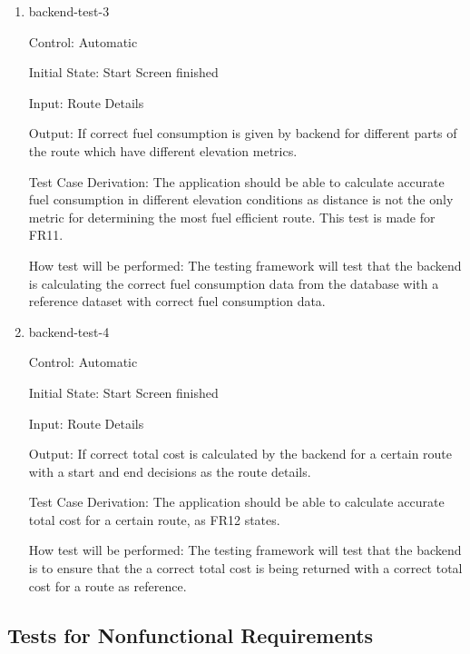 \documentclass[12pt, titlepage]{article}
\begin{document}
\begin{enumerate}
\item{backend-test-3\\}

Control: Automatic
					
Initial State: Start Screen finished
					
Input: Route Details
					
Output: If correct fuel consumption is given by backend for different parts of the route which have different elevation metrics.

Test Case Derivation: The application should be able to calculate accurate fuel consumption in different elevation conditions as 
distance is not the only metric for determining the most fuel efficient route. This test is made for FR11.
					
How test will be performed: The testing framework will test that the backend is calculating the correct fuel consumption data from the database 
with a reference dataset with correct fuel consumption data.
					
\item{backend-test-4\\}

Control: Automatic
					
Initial State: Start Screen finished
					
Input: Route Details
					
Output: If correct total cost is calculated by the backend for a certain route with a start and end decisions as the route details.

Test Case Derivation: The application should be able to calculate accurate total cost for a certain route, as FR12 states.
					
How test will be performed: The testing framework will test that the backend is to ensure that the a correct total cost is being returned 
with a correct total cost for a route as reference.

\end{enumerate}

\subsection{Tests for Nonfunctional Requirements}


\end{document}
